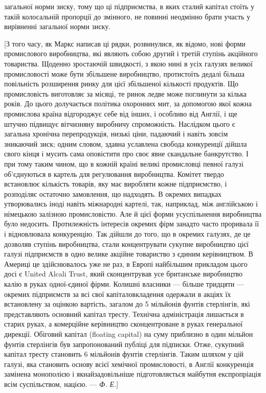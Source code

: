 \parcont{}  %
загальної норми зиску, тому що ці підприємства, в яких сталий
капітал стоїть у такій колосальній пропорції до змінного, не повинні неодмінно брати участь у
вирівненні загальної норми зиску.

[З того часу, як Маркс написав ці рядки, розвинулися, як
відомо, нові форми промислового виробництва, які являють
собою другий і третій ступінь акційного товариства. Щоденно
зростаючій швидкості, з якою нині в усіх галузях великої промисловості може бути збільшене
виробництво, протистоїть дедалі більша повільність розширення ринку для цієї збільшеної
кількості продуктів. Що промисловість виготовляє за місяці,
те ринок ледве може поглинути за кілька років. До цього долучається політика охоронних мит, за
допомогою якої кожна
промислова країна відгороджує себе від інших, і особливо від
Англії, і ще штучно підвищує вітчизняну виробничу спроможність.
Наслідком цього є загальна хронічна перепродукція, низькі ціни,
падаючий і навіть зовсім зникаючий зиск; одним словом, здавна
уславлена свобода конкуренції дійшла свого кінця і мусить
сама оповістити про своє явне скандальне банкрутство. І при
тому таким чином, що в кожній країні великі промисловці певної
галузі об’єднуються в картель для регулювання виробництва.
Комітет твердо встановлює кількість товарів, яку має виробляти кожне підприємство, і розподіляє
остаточно замовлення,
що надходять. В окремих випадках утворювались іноді навіть
міжнародні картелі, так, наприклад, між англійською і німецькою залізною промисловістю. Але й цієї
форми усуспільнення
виробництва було недосить. Протилежність інтересів окремих
фірм занадто часто проривала її і відновлювала конкуренцію. Так дійшли до того, що в окремих
галузях, де це
дозволяв ступінь виробництва, стали концентрувати сукупне
виробництво цієї галузі підприємств в одно велике акційне товариство з єдиним керівництвом. В
Америці це здійснювалось
уже не раз, в Европі найбільшим прикладом цього досі є United
Alcali Trust, який сконцентрував усе британське виробництво
калію в руках одної-єдиної фірми. Колишні власники —
більше тридцяти — окремих підприємств за всі свої капіталовкладення одержали в акціях їх встановлену
за оцінкою
вартість, загалом до 5 мільйонів фунтів стерлінгів, які представляють основний капітал тресту.
Технічна адміністрація лишається в старих руках, а комерційне керівництво сконцентроване в руках
генеральної дирекції. Обіговий капітал (floating
capital) на суму приблизно в один мільйон фунтів стерлінгів був
запропонований публіці для підписки. Отже, сукупний капітал
тресту становить 6 мільйонів фунтів стерлінгів. Таким шляхом
у цій галузі, яка становить основу всієї хемічної промисловості,
в Англії конкуренція замінена монополією і якнайзадовільніше
підготовляється майбутня експропріація всім суспільством,
нацією. — \emph{Ф. Е.}]

